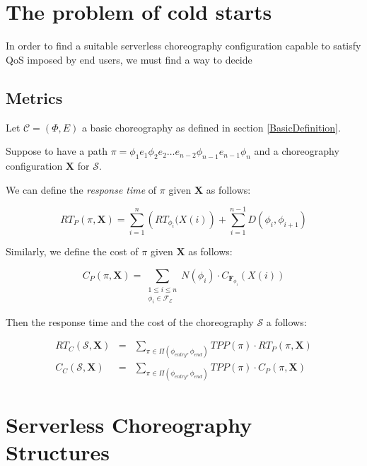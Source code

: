 \section{The problem of cold starts}

In order to find a suitable serverless choreography configuration capable to satisfy QoS imposed by end users, we must find a way to decide  





\subsection{Metrics}

Let $\mathcal{C} = (\Phi,E)$ a basic choreography as defined in section \ref{BasicDefinition}.



Suppose to have a path $\pi = \phi_1 e_1 \phi_2 e_2 \ldots e_{n-2}\phi_{n-1} e_{n-1} \phi_n$ and a choreography configuration $\textbf{X}$ for $\mathcal{S}$. 

We can define the \textit{response time} of $\pi$ given $\textbf{X}$ as follows:

\begin{equation}
	RT_P(\pi, \textbf{X}) = \sum_{i = 1}^n \left( RT_{\phi_i} (X(i) \right)  + \sum_{i = 1}^{n-1} D(\phi_i,\phi_{i+1})
\end{equation}

Similarly, we define the cost of $\pi$ given $\textbf{X}$ as follows:

\begin{equation}
	C_P(\pi, \textbf{X}) = \sum_{\substack{1\le i\le n\\ \phi_i \in \mathscr{F_E}}} N(\phi_i) \cdot C_{\textbf{F}_{\phi_i}} (X(i))
\end{equation}


Then the response time and the cost of the choreography $\mathcal{S}$ a follows:

\begin{eqnarray}
	RT_C(\mathcal{S}, \textbf{X}) & = & \sum_{\pi \in \Pi(\phi_{entry}, \phi_{end})} TPP(\pi) \cdot RT_{P}(\pi, \textbf{X}) \\
	C_C(\mathcal{S}, \textbf{X}) & = & \sum_{\pi \in \Pi(\phi_{entry}, \phi_{end})} TPP(\pi) \cdot C_{P}(\pi, \textbf{X}) 
\end{eqnarray}



\section{Serverless Choreography Structures}

